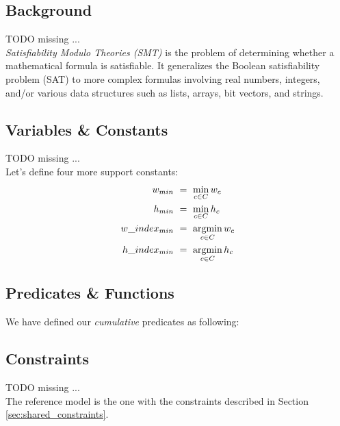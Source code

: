 
\subsection{Background}
    \colorbox{BurntOrange}{TODO missing ...}\\

    \textit{Satisfiability Modulo Theories (SMT)} is the problem of determining whether a
    mathematical formula is satisfiable. It generalizes the Boolean satisfiability problem (SAT) to
    more complex formulas involving real numbers, integers, and/or various data structures such as 
    lists, arrays, bit vectors, and strings.


\subsection{Variables \& Constants}
    \colorbox{BurntOrange}{TODO missing ...} \\
    Let's define four more support constants:
    \begin{align*}
      w_{min} &\ =\ \min_{c \in C} w_c \\
      h_{min} &\ =\ \min_{c \in C} h_c \\
      w\_index_{min} &\ =\ \operatorname*{argmin}_{c \in C} w_c \\
      h\_index_{min} &\ =\ \operatorname*{argmin}_{c \in C} h_c
    \end{align*}

  

\subsection{Predicates \& Functions}

    We have defined our \textit{cumulative} predicates as following:



\subsection{Constraints}
    \colorbox{BurntOrange}{TODO missing ...} \\
    The reference model is the one with the constraints described in Section \ref{sec:shared_constraints}. \\

